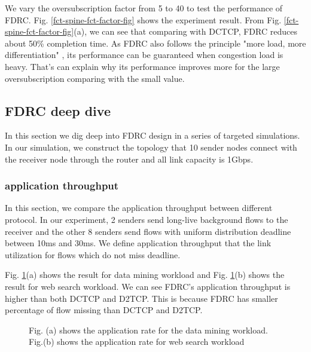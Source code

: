 \documentclass[10pt, conference, letterpaper]{IEEEtran}
\begin{document}
We vary the oversubscription factor from 5 to 40 to test the performance of FDRC.
Fig. \ref{fct-spine-fct-factor-fig} shows the experiment result. From Fig. \ref{fct-spine-fct-factor-fig}(a), we can see that comparing with DCTCP, FDRC reduces
about 50\% completion time.  As FDRC also follows the principle "more load, more differentiation" \cite{LPD}, its performance can be guaranteed when congestion load is heavy. 
That's can explain why its performance improves more for the large oversubscription comparing with the small value.







\iffalse
\subsection{FDRC deep dive} \label{evaluation_deep}
In this section we dig deep into FDRC design in a series of targeted simulations. In our simulation, we construct the topology that 10 sender nodes connect with the receiver node through the 
router and all link capacity is 1Gbps. 


\subsubsection{application throughput}

In this section, we compare the application throughput between different protocol. In our experiment, 
2 senders send long-live background flows to the receiver and the other 8 senders send flows with
uniform distribution deadline between 10ms and 30ms. We define application throughput that the link utilization for flows which do not miss deadline. 


Fig. \ref{app-rate}(a) shows the result for data mining workload 
and Fig. \ref{app-rate}(b) shows the result for web search workload. 
We can see FDRC's application throughput is higher than both DCTCP and D2TCP.
 This is because FDRC has smaller percentage of flow missing than
DCTCP and D2TCP.

\begin{figure}[t]
\centering
{}
\caption{Fig. (a) shows the application rate for the data mining workload. Fig.(b) shows the application rate for web search workload}
\label{app-rate}
\end{figure}
\end{document}
